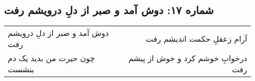 \begin{center}
\section*{شماره ۱۷: دوش آمد و صبر از دلِ درویشم رفت}
\label{sec:017}
\begin{longtable}{l p{0.5cm} r}
دوش آمد و صبر از دلِ درویشم رفت
&&
آرام زعقلِ حکمت اندیشم رفت
\\
چون حیرت من بدید یک دم بنشست
&&
درخوابِ خوشم کرد و خوش از پیشم رفت
\\
\end{longtable}
\end{center}
